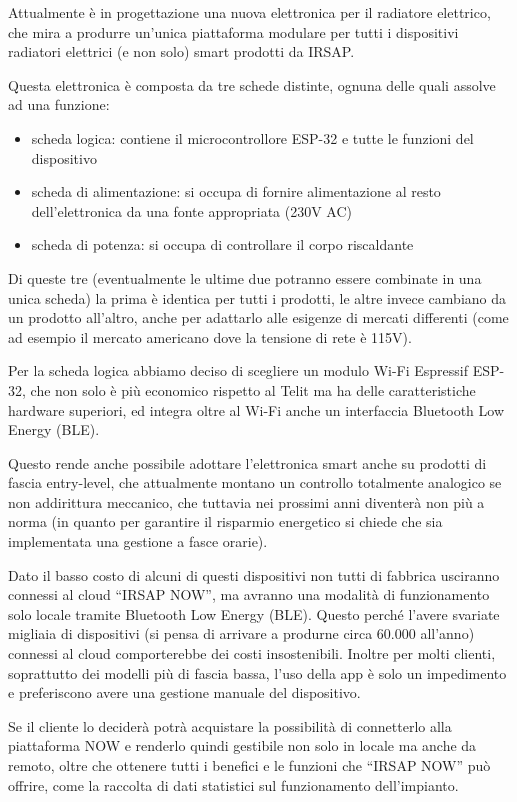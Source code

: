 \documentclass[12pt,a4paper,twoside,titlepage]{book}
\begin{document}
Attualmente è in progettazione una nuova elettronica per il radiatore elettrico,
che mira a produrre un'unica piattaforma modulare per tutti i dispositivi radiatori elettrici
(e non solo) smart prodotti da IRSAP.

Questa elettronica è composta da tre schede distinte, ognuna delle quali assolve
ad una funzione:
\begin{itemize}
    \item scheda logica: contiene il microcontrollore ESP-32 e tutte le funzioni del dispositivo
    \item scheda di alimentazione: si occupa di fornire alimentazione al resto dell'elettronica
        da una fonte appropriata (230V AC)
    \item scheda di potenza: si occupa di controllare il corpo riscaldante
\end{itemize}

Di queste tre (eventualmente le ultime due potranno essere combinate in una
unica scheda) la prima è identica per tutti i prodotti, le altre invece cambiano
da un prodotto all'altro, anche per adattarlo alle esigenze di mercati differenti
(come ad esempio il mercato americano dove la tensione di rete è 115V).

Per la scheda logica abbiamo deciso di scegliere un modulo Wi-Fi Espressif
ESP-32, che non solo è più economico rispetto al Telit ma ha delle caratteristiche
hardware superiori, ed integra oltre al Wi-Fi anche un interfaccia Bluetooth Low Energy (BLE).

Questo rende anche possibile adottare l'elettronica smart anche su prodotti di
fascia entry-level, che attualmente montano un controllo totalmente analogico se non
addirittura meccanico, che tuttavia nei prossimi anni diventerà non più a norma (in
quanto per garantire il risparmio energetico si chiede che sia implementata una gestione
a fasce orarie).

Dato il basso costo di alcuni di questi dispositivi non tutti di fabbrica usciranno
connessi al cloud ``IRSAP NOW'', ma avranno una modalità di funzionamento solo locale
tramite Bluetooth Low Energy (BLE). Questo perché l'avere svariate migliaia di dispositivi
(si pensa di arrivare a produrne circa 60.000 all'anno) connessi al cloud comporterebbe
dei costi insostenibili. Inoltre per molti clienti, soprattutto dei modelli più di
fascia bassa, l'uso della app è solo un impedimento e preferiscono avere una gestione
manuale del dispositivo.

Se il cliente lo deciderà potrà acquistare la possibilità di connetterlo alla piattaforma
NOW e renderlo quindi gestibile non solo in locale ma anche da remoto, oltre che
ottenere tutti i benefici e le funzioni che ``IRSAP NOW'' può offrire, come la
raccolta di dati statistici sul funzionamento dell'impianto.
\end{document}
